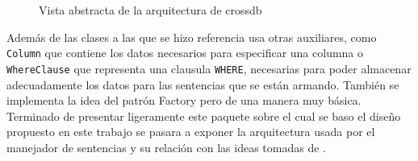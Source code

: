 \begin{figure}
  \centering
   \label{fig:subfig:crossdb:base-idea}
  \qquad 
   \label{fig:subfig:crossdb:base-idea-select}
  \caption{Vista abstracta de la arquitectura de crossdb}
  \label{fig:crossdb:base-idea}
\end{figure}

Además de las clases a las que se hizo referencia \cc usa otras auxiliares, como \verb=Column= que contiene los datos necesarios para especificar una columna o \verb=WhereClause= que representa una clausula \verb=WHERE=, necesarias para poder almacenar adecuadamente los datos para las sentencias que se están armando. También se implementa la idea del patrón Factory pero de una manera muy básica. Terminado de presentar ligeramente este paquete sobre el cual se baso el diseño propuesto en este trabajo se pasara a exponer la arquitectura usada por el manejador de sentencias y su relación con las ideas tomadas de \cc.
%
